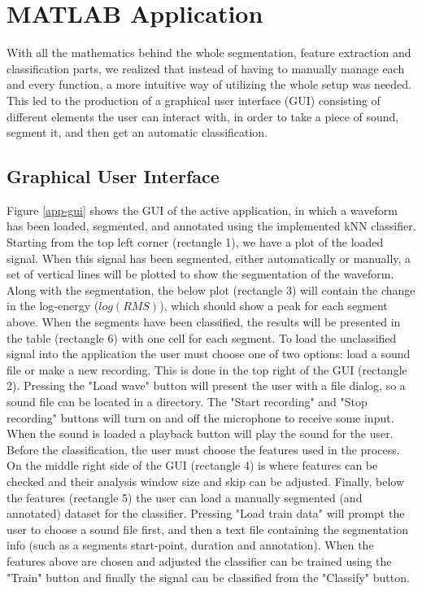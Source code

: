 \section{MATLAB Application}
With all the mathematics behind the whole segmentation, feature extraction and classification parts, we realized that instead of having to manually manage each and every function, a more intuitive way of utilizing the whole setup was needed. This led to the production of a graphical user interface (GUI) consisting of different elements the user can interact with, in order to take a piece of sound, segment it, and then get an automatic classification.

\subsection{Graphical User Interface}
Figure \ref{app-gui} shows the GUI of the active application, in which a waveform has been loaded, segmented, and annotated using the implemented kNN classifier. Starting from the top left corner (rectangle 1), we have a plot of the loaded signal. When this signal has been segmented, either automatically or manually, a set of vertical lines will be plotted to show the segmentation of the waveform. Along with the segmentation, the below plot (rectangle 3) will contain the change in the log-energy ($log(RMS)$), which should show a peak for each segment above. When the segments have been classified, the results will be presented in the table (rectangle 6) with one cell for each segment. To load the unclassified signal into the application the user must choose one of two options: load a sound file or make a new recording. This is done in the top right of the GUI (rectangle 2). Pressing the "Load wave" button will present the user with a file dialog, so a sound file can be located in a directory. The "Start recording" and "Stop recording" buttons will turn on and off the microphone to receive some input. When the sound is loaded a playback button will play the sound for the user. Before the classification, the user must choose the features used in the process. On the middle right side of the GUI (rectangle 4) is where features can be checked and their analysis window size and skip can be adjusted. Finally, below the features (rectangle 5) the user can load a manually segmented (and annotated) dataset for the classifier. Pressing "Load train data" will prompt the user to choose a sound file first, and then a text file containing the segmentation info (such as a segments start-point, duration and annotation). When the features above are chosen and adjusted the classifier can be trained using the "Train" button and finally the signal can be classified from the "Classify" button.


